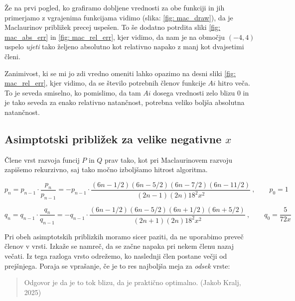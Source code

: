 \documentclass[slovene,11pt,a4paper]{article}
\begin{document}
Že na prvi pogled, ko grafiramo dobljene vrednosti za obe funkciji in jih primerjamo z vgrajenima funkcijama vidimo (slika: \ref{fig: mac_draw}), da je Maclaurinov približek precej uspešen. To še dodatno potrdita sliki \ref{fig: mac_abs_err} in \ref{fig: mac_rel_err}, kjer vidimo, da nam je na območju $(-4, 4)$ uspelo \textit{ujeti} tako željeno absolutno kot relativno napako z manj kot dvajsetimi členi.

Zanimivost, ki se mi jo zdi vredno omeniti lahko opazimo na desni sliki \ref{fig: mac_rel_err}, kjer vidimo, da se število potrebnih členov funkcije $Ai$ hitro veča. To je seveda smiselno, ko pomislimo, da tam $Ai$ dosega vrednosti zelo blizu $0$ in je tako seveda za enako relativno natančnost, potrebna veliko boljša absolutna natančnost.
\newpage



\subsection{Asimptotski približek za velike negativne $x$}

Člene vrst razvoja funcij $P$ in $Q$ prav tako, kot pri Maclaurinovem razvoju zapišemo rekurzivno, saj tako močno izboljšamo hitrost algoritma.

\begin{equation*}
  p_n = p_{n-1} \cdot \frac{p_n}{p_{n-1}} = - p_{n-1} \cdot \frac{(6n - 1/2)(6n - 5/2)(6n - 7/2)(6n - 11/2)}{(2n - 1)(2n)18^2x^2} \>, \qquad p_0 = 1
\end{equation*}

\begin{equation*}
  q_n = q_{n-1} \cdot \frac{q_n}{q_{n-1}} = - q_{n-1} \cdot \frac{(6n - 1/2)(6n - 5/2)(6n + 1/2)(6n + 5/2)}{(2n + 1)(2n)18^2x^2} \>, \qquad q_0 = \frac{5}{72x}
\end{equation*}

Pri obeh asimptotskih priblizkih moramo sicer paziti, da ne uporabimo preveč členov v vrsti. Izkaže se namreč, da se začne napaka pri nekem členu nazaj večati. Iz tega razloga vrsto odrežemo, ko naslednji člen postane večji od prejšnjega. Poraja se vprašanje, če je to res najboljša meja za \textit{odsek} vrste: 
\begin{quote}
  Odgovor je da je to tok blizu, da je praktično optimalno. (Jakob Kralj, 2025)
\end{quote}
\end{document}
